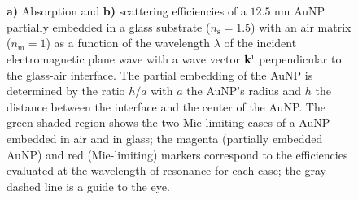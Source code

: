 \begin{figure}[h!]
    \def\svgwidth{\textwidth}
    \small
     \\[-15em]
    \hspace*{-.375\textwidth}%
        \begin{subfigure}{.765\textwidth}\caption{ }\label{sfig:IncNormal:1}\end{subfigure}%
        \begin{subfigure}{.25\textwidth}\caption{ }\label{sfig:IncNormal:2}\end{subfigure}\\[11.5em]
    \caption[Absorption and Scattering Efficiencies of a partially embedded 12.5 nm AuNP into a substrate Illuminated in an internal configuration at normal incidence]{\textbf{a)} Absorption and \textbf{b)} scattering efficiencies of a $12.5$ nm AuNP partially embedded in a glass substrate ($n_\text{s} = 1.5$) with an air matrix ($n_\text{m} = 1$) as a function of the wavelength $\lambda$ of the incident electromagnetic plane wave with a wave vector $\vb{k}^\text{i}$ perpendicular to the glass-air interface. The partial embedding of the AuNP is determined by the ratio $h/a$ with $a$ the AuNP's radius and $h$ the distance between the interface and the center of the AuNP. The green shaded region shows the two Mie-limiting cases of a AuNP embedded in air and in glass; the magenta (partially embedded AuNP) and red (Mie-limiting) markers correspond to the efficiencies evaluated at the wavelength of resonance for each case; the gray dashed line is a guide to the eye.}
    \label{fig:Inc:Eff}
\end{figure}

